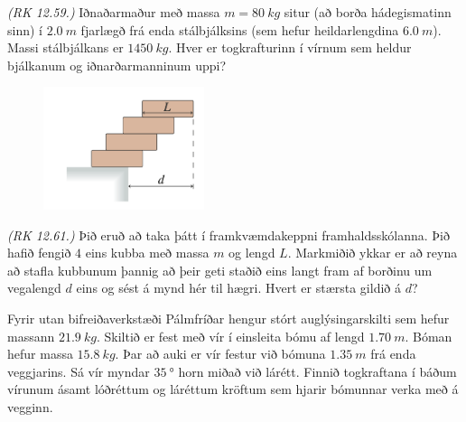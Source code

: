 \ifdefined \wholebook \else\documentclass[oneside]{book}\usepackage{EdlBook}\graphicspath{{figures/}}
\begin{document}
\begin{enumerate}[label = \textbf{Dæmi \thechapter.\arabic*.}]
\begin{minipage}{\linewidth}
\item \textit{(RK 12.59.)} Iðnaðarmaður með massa $m = \SI{80}{kg}$ situr (að borða hádegismatinn sinn) í $\SI{2.0}{m}$ fjarlægð frá enda stálbjálksins (sem hefur heildarlengdina $\SI{6.0}{m}$). Massi stálbjálkans er $\SI{1450}{kg}$. Hver er togkrafturinn í vírnum sem heldur bjálkanum og iðnarðarmanninum uppi?
\end{minipage}

\vspace{0.5cm}

\begin{minipage}{\linewidth}

\begin{figure}
\vspace{0.5cm}
\includegraphics[width=1.85in]{images/restacks.png}
\end{figure}

\item \textit{(RK 12.61.)} Þið eruð að taka þátt í framkvæmdakeppni framhaldsskólanna. Þið hafið fengið $4$ eins kubba með massa $m$ og lengd $L$. Markmiðið ykkar er að reyna að stafla kubbunum þannig að þeir geti staðið eins langt fram af borðinu um vegalengd $d$ eins og sést á mynd hér til hægri. Hvert er stærsta gildið á $d$?

\vspace{0.5cm}


\item Fyrir utan bifreiðaverkstæði Pálmfríðar hengur stórt auglýsingarskilti sem hefur massann $\SI{21.9}{kg}$. Skiltið er fest með vír í einsleita bómu af lengd $\SI{1.70}{m}$. Bóman hefur massa $\SI{15.8}{kg}$. Þar að auki er vír festur við bómuna $\SI{1.35}{m}$ frá enda veggjarins. Sá vír myndar $\SI{35}{\degree}$ horn miðað við lárétt.  Finnið togkraftana í báðum vírunum ásamt lóðréttum og láréttum kröftum sem hjarir bómunnar verka með á vegginn.
\end{minipage}


\end{enumerate}
\end{document}
